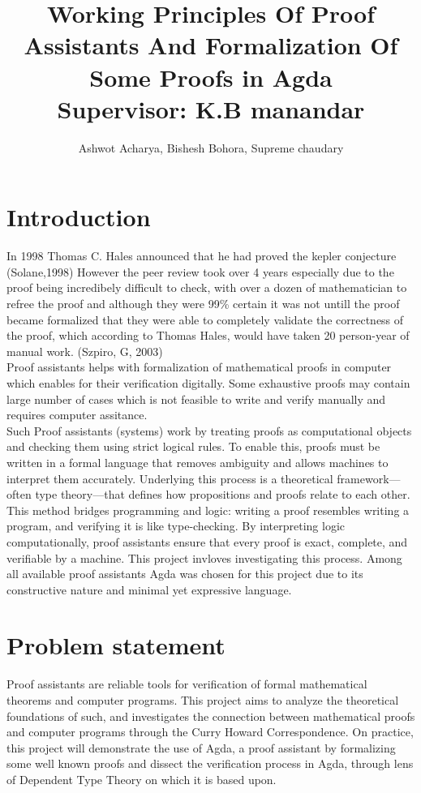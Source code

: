 \documentclass{article}
\title{
    {Working Principles Of Proof Assistants And Formalization Of Some Proofs in Agda}\\
    {\large Supervisor: K.B manandar}\\


    }
\author{ Ashwot Acharya, Bishesh Bohora, Supreme chaudary}
\begin{document}
\maketitle

\pagebreak
\section{Introduction}
In 1998 Thomas C. Hales announced that he had proved the kepler conjecture (Solane,1998) However the peer review took over 4 years especially due to the proof being incredibely difficult to check, with over a dozen of mathematician to refree the proof and although 
they were 99\% certain it was not untill the proof became formalized that they were able to completely validate the correctness of the proof, which according to Thomas Hales, would have taken 20 person-year of manual work. (Szpiro, G, 2003)
\\Proof assistants helps with formalization of mathematical proofs in computer which enables for their verification digitally.
Some exhaustive proofs may contain large number of cases which is not feasible to write and verify manually and requires computer assitance.\\ 
Such Proof assistants (systems) work by treating proofs as computational objects and checking them using strict logical rules. To enable this, proofs must be written in a formal language that removes ambiguity and allows machines to interpret them accurately. Underlying this process is a theoretical framework—often type theory—that defines how propositions and proofs relate to each other.
\\
This method bridges programming and logic: writing a proof resembles writing a program, and verifying it is like type-checking. By interpreting logic computationally, proof assistants ensure that every proof is exact, complete, and verifiable by a machine. This project invloves investigating this process. Among all available proof assistants Agda was chosen for this project due to its constructive nature and minimal yet expressive language.
\section{Problem statement}
Proof assistants are reliable tools for verification of formal mathematical theorems and computer programs. This project aims to analyze the theoretical foundations of such, and investigates the connection between mathematical proofs and computer programs through the Curry Howard Correspondence. On practice, this project will demonstrate the use of Agda, a proof assistant by formalizing some well known proofs and dissect the verification process in Agda, 
through lens of Dependent Type Theory on which it is based upon. 
\end{document}
